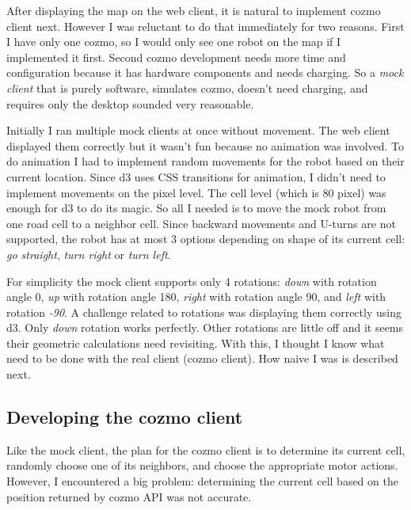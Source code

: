 \documentclass[12pt,a4paper]{article}
\begin{document}
After displaying the map on the web client, it is natural to implement cozmo client next. However I was reluctant to do that immediately for two reasons. First I have only one cozmo, so I would only see one robot on the map if I implemented it first. Second cozmo development needs more time and configuration because it has hardware components and needs charging. So a \textit{mock client} that is purely software, simulates cozmo, doesn't need charging,  and requires only the desktop sounded very reasonable. 

Initially I ran multiple mock clients at once without movement. The web client displayed them correctly but it wasn't fun because no animation was involved. To do animation I had to implement random movements for the robot based on their current location. Since d3 uses CSS transitions for animation, I didn't need to implement movements on the pixel level. The cell level (which is 80 pixel) was enough for d3 to do its magic. So all I needed is to move the mock robot from one road cell to a neighbor cell. Since backward movements and U-turns are not supported, the robot has at most 3 options depending on shape of its current cell: \textit{go straight}, \textit{turn right} or \textit{turn left}. 

For simplicity the mock client supports only 4 rotations: \textit{down} with rotation angle 0, \textit{up} with rotation angle 180, \textit{right} with rotation angle 90, and \textit{left} with rotation \textit{-90}. A challenge related to rotations was displaying them correctly using d3. Only \textit{down} rotation works perfectly. Other rotations are little off and it seems their geometric calculations need revisiting. With this, I thought I know what need to be done with the real client (cozmo client). How naive I was is described next. 

\subsection{Developing the cozmo client} \label{sec:failures}

Like the mock client, the plan for the cozmo client is to determine its current cell, randomly choose one of its neighbors, and choose the appropriate motor actions. However, I encountered a big problem: determining the current cell based on the position returned by cozmo  API was not accurate. 
\end{document}
